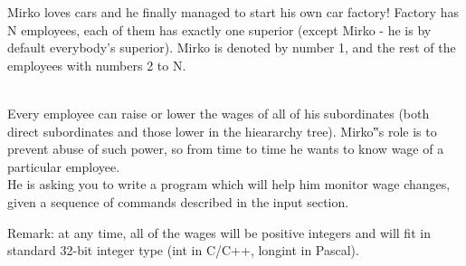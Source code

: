Mirko loves cars and he finally managed to start his own car factory! Factory has N employees, each of them has exactly one superior (except Mirko - he is by default everybody's superior). Mirko is denoted by number 1, and the rest of the employees with numbers 2 to N.


\\Every employee can raise or lower the wages of all of his subordinates (both direct subordinates and those lower in the hieararchy tree). Mirko‟s role is to prevent abuse of such power, so from time to time he wants to know wage of a particular employee.
\\He is asking you to write a program which will help him monitor wage changes, given a sequence of commands described in the input section.

Remark: at any time, all of the wages will be positive integers and will fit in standard 32-bit integer type (int in C/C++, longint in Pascal).